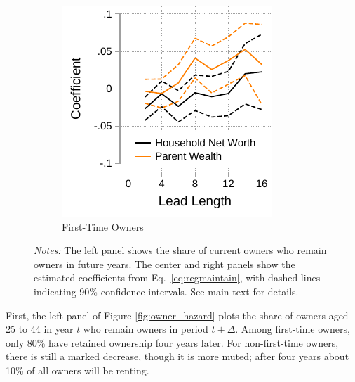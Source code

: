 \documentclass[12pt]{article}
\begin{document}
\begin{figure}[tb]
\begin{subfigure}{0.33\textwidth}
	\end{subfigure}%
	\hfill
	\begin{subfigure}{0.33\textwidth}%
		\caption{First-Time Owners}\label{fig:coef_ftowner}%
		\includegraphics[width=\textwidth]{../tabfig/descr/PSID_coefftowner.pdf}%
	\end{subfigure}%
	
	\caption*{\footnotesize \textit{Notes:} The left panel shows the share of current owners who remain owners in future years. The center and right panels show the estimated coefficients from Eq.~\ref{eq:regmaintain}, with dashed lines indicating 90\% confidence intervals. See main text for details.}
\end{figure}

First, the left panel of Figure \ref{fig:owner_hazard} plots the share of owners aged 25 to 44 in year $t$ who remain owners in period $t+\Delta$. Among first-time owners, only 80\% have retained ownership four years later. For non-first-time owners, there is still a marked decrease, though it is more muted; after four years about 10\% of all owners will be renting.
\end{document}

